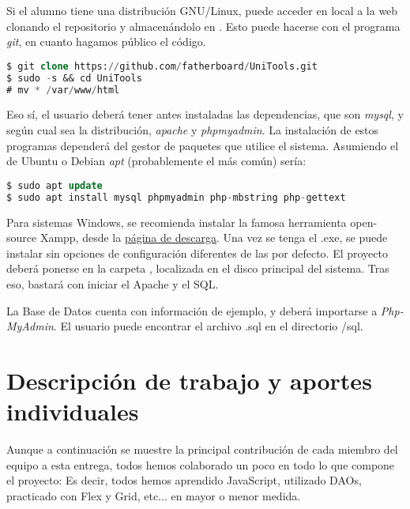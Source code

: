 \documentclass[12pt]{report}
\begin{document}
Si el alumno tiene una distribución GNU/Linux, puede acceder en local a la web clonando el repositorio y almacenándolo en . Esto puede hacerse con el programa \textit{git}, en cuanto hagamos público el código.
\newline

\begin{lstlisting}[language=SQL]
$ git clone https://github.com/fatherboard/UniTools.git
$ sudo -s && cd UniTools
# mv * /var/www/html
\end{lstlisting}
Eso sí, el usuario deberá tener antes instaladas las dependencias, que son \textit{mysql}, y según cual sea la distribución, \textit{apache} y \textit{phpmyadmin}. La instalación de estos programas dependerá del gestor de paquetes que utilice el sistema. Asumiendo el de Ubuntu o Debian \textit{apt} (probablemente el más común) sería:
\newline
\begin{lstlisting}[language=SQL]
$ sudo apt update
$ sudo apt install mysql phpmyadmin php-mbstring php-gettext
\end{lstlisting}
Para sistemas Windows, se recomienda instalar la famosa herramienta open-source Xampp, desde la \hyperlink{https://www.apachefriends.org/download.html}{página de descarga}. Una vez se tenga el .exe, se puede instalar sin opciones de configuración diferentes de las por defecto. El proyecto deberá ponerse en la carpeta , localizada en el disco principal del sistema. Tras eso, bastará con iniciar el Apache y el SQL.

La Base de Datos cuenta con información de ejemplo, y deberá importarse a \textit{Php-MyAdmin}. El usuario puede encontrar el archivo .sql en el directorio {/sql}.


\section{Descripción de trabajo y aportes individuales}

Aunque a continuación se muestre la principal contribución de cada miembro del equipo a esta entrega, todos hemos colaborado un poco en todo lo que compone el proyecto: Es decir, todos hemos aprendido JavaScript, utilizado DAOs, practicado con Flex y Grid, etc... en mayor o menor medida.
\end{document}
